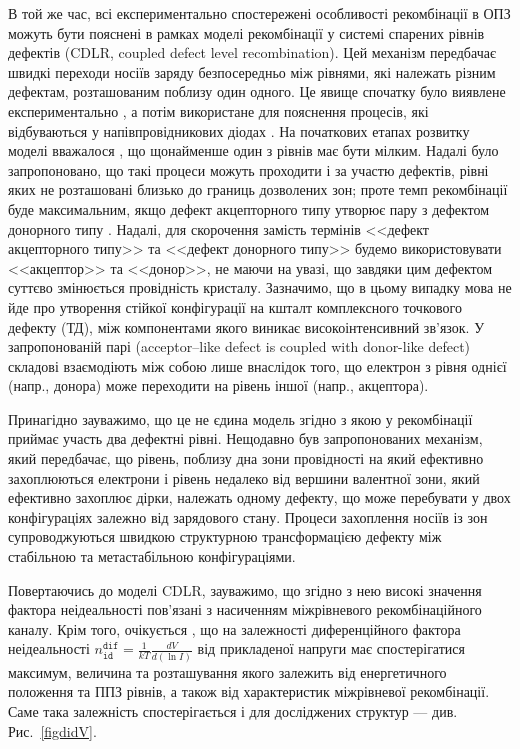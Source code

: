 В той же час, всі експериментально спостережені особливості рекомбінації в ОПЗ можуть бути пояснені в рамках
моделі рекомбінації у системі спарених рівнів дефектів (CDLR, coupled defect level recombination).
Цей механізм передбачає швидкі переходи носіїв заряду безпосередньо між рівнями, які належать різним дефектам,
розташованим поблизу один одного.
Це явище спочатку було виявлене експериментально \cite{DAPR:Chen1991,DAPR:Chen1994},
а потім використане для пояснення процесів, які відбуваються у напівпровідникових діодах \cite{CDLR:JAP1995,CDLR:JAP,CDLR:SSP,Breitenstein2013,CDLR:SupMicr}.
На початкових етапах розвитку моделі вважалося \cite{CDLR:JAP1995}, що щонайменше один з рівнів має бути
мілким.
Надалі було запропоновано, що такі процеси можуть проходити і за участю дефектів, рівні яких не розташовані близько до границь дозволених зон;
проте темп рекомбінації буде максимальним, якщо дефект акцепторного типу утворює пару з дефектом донорного типу \cite{CDLR:JAP}.
Надалі, для скорочення замість термінів <<дефект акцепторного типу>> та <<дефект донорного типу>>
будемо використовувати <<акцептор>> та <<донор>>, не маючи на увазі, що завдяки цим дефектом суттєво змінюється провідність кристалу.
Зазначимо, що в цьому випадку мова не йде про утворення стійкої конфігурації на кшталт комплексного точкового дефекту (ТД),
між компонентами якого виникає високоінтенсивний зв'язок.
У запропонованій парі (acceptor--like defect is coupled with donor-like defect) складові взаємодіють
між собою лише внаслідок того, що електрон з рівня однієї (напр., донора) може переходити на рівень іншої (напр., акцептора).

Принагідно зауважимо, що це не єдина модель згідно з якою у рекомбінації приймає участь два
дефектні рівні.
Нещодавно \cite{TwoLevelRecomb} був запропонованих механізм, який передбачає, що рівень, поблизу дна зони провідності
на який ефективно захоплюються електрони і рівень недалеко від вершини валентної зони, який ефективно захоплює дірки,
належать одному дефекту, що може перебувати у двох конфігураціях залежно від зарядового стану.
Процеси захоплення носіїв із зон супроводжуються швидкою структурною трансформацією дефекту між стабільною та метастабільною конфігураціями.

Повертаючись до моделі CDLR,
зауважимо, що згідно з нею високі значення фактора неідеальності пов'язані з насиченням
міжрівневого рекомбінаційного каналу.
Крім того, очікується \cite{CDLR:JAP,Breitenstein2013}, що
на залежності диференційного фактора неідеальності
$n_\mathtt{id}^\mathtt{dif}=\frac{1}{kT}\frac{dV}{d(\ln I)}$ від прикладеної напруги має
спостерігатися максимум, величина та розташування якого залежить від енергетичного положення та
ППЗ рівнів, а також від характеристик міжрівневої рекомбінації.
Саме така залежність спостерігається і для досліджених структур --- див. Рис.~\ref{figdidV}.


